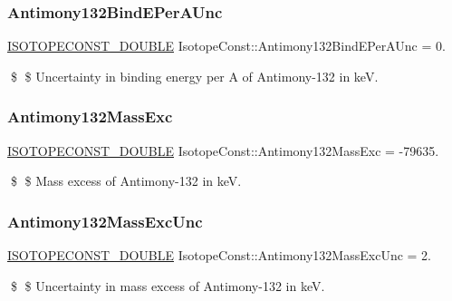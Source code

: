 \subsubsection{\texorpdfstring{Antimony132\+Bind\+E\+Per\+A\+Unc}{Antimony132BindEPerAUnc}}
{\footnotesize\ttfamily \mbox{\hyperlink{group___isotope_const-_macros_ga8f45a7272ce02c0b4c65c44636ed719a}{I\+S\+O\+T\+O\+P\+E\+C\+O\+N\+S\+T\+\_\+\+D\+O\+U\+B\+LE}} Isotope\+Const\+::\+Antimony132\+Bind\+E\+Per\+A\+Unc = 0.}

\$ \$ Uncertainty in binding energy per A of Antimony-\/132 in keV. \mbox{\label{group___isotope_const-_antimony-_sb132_ga8882e05fe71c3a9f0ed05237143b05c1}} 
\subsubsection{\texorpdfstring{Antimony132\+Mass\+Exc}{Antimony132MassExc}}
{\footnotesize\ttfamily \mbox{\hyperlink{group___isotope_const-_macros_ga8f45a7272ce02c0b4c65c44636ed719a}{I\+S\+O\+T\+O\+P\+E\+C\+O\+N\+S\+T\+\_\+\+D\+O\+U\+B\+LE}} Isotope\+Const\+::\+Antimony132\+Mass\+Exc = -\/79635.}

\$ \$ Mass excess of Antimony-\/132 in keV. \mbox{\label{group___isotope_const-_antimony-_sb132_ga7d7205c97a2996efe7e94f43ac854c45}} 
\subsubsection{\texorpdfstring{Antimony132\+Mass\+Exc\+Unc}{Antimony132MassExcUnc}}
{\footnotesize\ttfamily \mbox{\hyperlink{group___isotope_const-_macros_ga8f45a7272ce02c0b4c65c44636ed719a}{I\+S\+O\+T\+O\+P\+E\+C\+O\+N\+S\+T\+\_\+\+D\+O\+U\+B\+LE}} Isotope\+Const\+::\+Antimony132\+Mass\+Exc\+Unc = 2.}

\$ \$ Uncertainty in mass excess of Antimony-\/132 in keV. \mbox{\label{group___isotope_const-_antimony-_sb132_ga2b4032e5a67d4b02e5038ad4167569f1}} 
